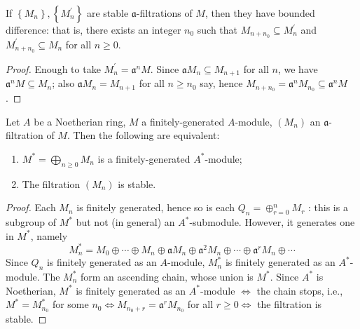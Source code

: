 \begin{lemma}
    If $\left\{M_n\right\},\left\{M^{\prime}_n\right\}$ are stable $\mathfrak{a}$-filtrations of $M$, then they have bounded difference: that is, there exists an integer $n_0$ such that $M_{n+n_0} \subseteq M_n^{\prime}$ and $M_{n+n_0}^{\prime} \subseteq M_n$ for all $n \geqslant 0$.
    \begin{proof}
        Enough to take $M_n^{\prime}=\mathfrak{a}^n M$. Since $\mathfrak{a} M_n \subseteq M_{n+1}$ for all $n$, we have $\mathfrak{a}^n M \subseteq M_n$; also $\mathfrak{a} M_n=M_{n+1}$ for all $n \geqslant n_0$ say, hence $M_{n+n_0}=\mathfrak{a}^n M_{n_0} \subseteq \mathfrak{a}^n M$.
    \end{proof}
\end{lemma}
\begin{lemma}
    Let $A$ be a Noetherian ring, $M$ a finitely-generated $A$-module, $\left(M_n\right)$ an $\mathfrak{a}$-filtration of $M$. Then the following are equivalent:
    \begin{enumerate}
        \item
              $M^*=\bigoplus_{n \geq 0} M_n$ is a finitely-generated $A^*$-module;
        \item
              The filtration $\left(M_n\right)$ is stable.
    \end{enumerate}
    \begin{proof}
        Each $M_n$ is finitely generated, hence so is each $Q_n=\oplus_{r=0}^n M_r$ : this is a subgroup of $M^*$ but not (in general) an $A^*$-submodule. However, it generates one in $M^*$, namely
        \begin{equation*}
            M_n^*=M_0 \oplus \cdots \oplus M_n \oplus \mathfrak{a} M_n \oplus \mathfrak{a}^2 M_n \oplus \cdots \oplus \mathfrak{a}^r M_n \oplus \cdots
        \end{equation*}
        Since $Q_n$ is finitely generated as an $A$-module, $M_n^*$ is finitely generated as an $A^*$-module. The $M_n^*$ form an ascending chain, whose union is $M^*$. Since $A^*$ is Noetherian, $M^*$ is finitely generated as an $A^*$-module $\Leftrightarrow$ the chain stops, i.e., $M^*=M_{n_0}^*$ for some $n_0 \Leftrightarrow M_{n_0+r}=\mathfrak{a}^r M_{n_0}$ for all $r \geqslant 0 \Leftrightarrow$ the filtration is stable.
    \end{proof}
\end{lemma}



